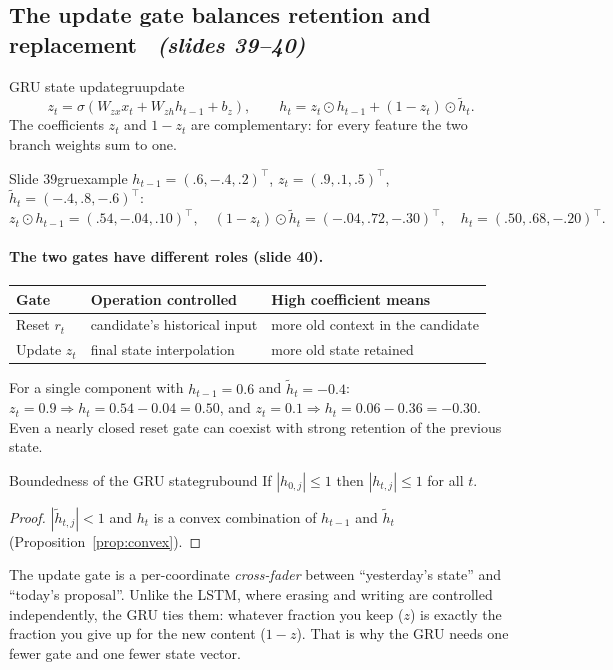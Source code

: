 \documentclass[11pt,a4paper]{article}
\newcommand{\thh}{\tilde h}
\newcommand{\sltag}[1]{\texorpdfstring{\ \emph{(slides #1)}}{ (slides #1)}}
\begin{document}
\subsection{The update gate balances retention and replacement \sltag{39--40}}

\begin{definition}{GRU state update}{gruupdate}
\[
z_t=\sigma(W_{zx}x_t+W_{zh}h_{t-1}+b_z),\qquad h_t=z_t\odot h_{t-1}+(1-z_t)\odot\thh_t .
\]
The coefficients $z_t$ and $1-z_t$ are complementary: for every feature the two branch weights sum to one.
\end{definition}

\begin{example}{Slide 39}{gruexample}
$h_{t-1}=(.6,-.4,.2)^\top$, $z_t=(.9,.1,.5)^\top$, $\thh_t=(-.4,.8,-.6)^\top$:
\[
z_t\odot h_{t-1}=(.54,-.04,.10)^\top,\quad(1-z_t)\odot\thh_t=(-.04,.72,-.30)^\top,\quad h_t=(.50,.68,-.20)^\top .
\]
\end{example}

\paragraph{The two gates have different roles (slide 40).}
\begin{center}
\begin{tabular}{llp{4.4cm}}\toprule
Gate & Operation controlled & High coefficient means\\ \midrule
Reset $r_t$ & candidate's historical input & more old context in the candidate\\
Update $z_t$ & final state interpolation & more old state retained\\ \bottomrule
\end{tabular}
\end{center}
For a single component with $h_{t-1}=0.6$ and $\thh_t=-0.4$: $z_t=0.9\Rightarrow h_t=0.54-0.04=0.50$, and $z_t=0.1\Rightarrow h_t=0.06-0.36=-0.30$. Even a nearly closed reset gate can coexist with strong retention of the previous state.

\begin{proposition}{Boundedness of the GRU state}{grubound}
If $|h_{0,j}|\le1$ then $|h_{t,j}|\le1$ for all $t$.
\end{proposition}
\begin{proof}
$|\thh_{t,j}|<1$ and $h_t$ is a convex combination of $h_{t-1}$ and $\thh_t$ (Proposition~\ref{prop:convex}).
\end{proof}

\begin{intuition}
The update gate is a per-coordinate \emph{cross-fader} between ``yesterday's state'' and ``today's proposal''. Unlike the LSTM, where erasing and writing are controlled independently, the GRU ties them: whatever fraction you keep ($z$) is exactly the fraction you give up for the new content ($1-z$). That is why the GRU needs one fewer gate and one fewer state vector.
\end{intuition}
\end{document}
